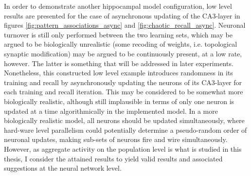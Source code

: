 In order to demonstrate another hippocampal model configuration, low level results are presented for the case of asynchronous updating of the CA3-layer in figures \ref{fig:pattern_associations_async} and \ref{fig:chaotic_recall_async}. Neuronal turnover is still only performed between the two learning sets, which may be argued to be biologically unrealistic (some recoding of weights, i.e. topological synaptic modification) may be argued to be continuously present, at a low rate, however. The latter is something that will be addressed in later experiments. 
Nonetheless, this constructed low level example introduces randomness in its training and recall by asynchronously updating the neurons of its CA3-layer for each training and recall iteration. This may be considered to be somewhat more biologically realistic, although still implausible in terms of only one neuron is updated at a time algorithmically in the implemented model. In a more biologically realistic model, all neurons should be updated simultaneously, where hard-ware level parallelism could potentially determine a pseudo-random order of neuronal updates, making sub-sets of neurons fire and wire simultaneously. 
However, as aggregate activity on the population level is what is studied in this thesis, I consider the attained results to yield valid results and associated suggestions at the neural network level.

